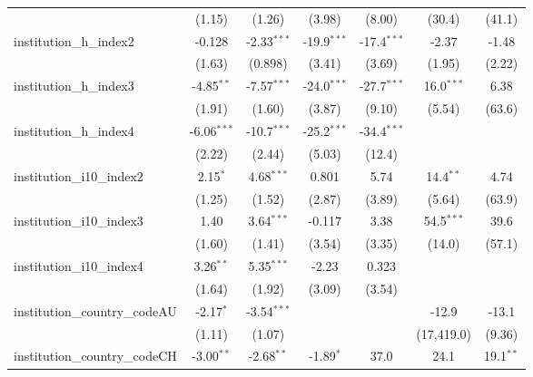 \begin{tabular}{lcccccc}
                                         & (1.15)        & (1.26)        & (3.98)        & (8.00)        & (30.4)       & (41.1)\\   
   institution\_h\_index2                & -0.128        & -2.33$^{***}$ & -19.9$^{***}$ & -17.4$^{***}$ & -2.37        & -1.48\\   
                                         & (1.63)        & (0.898)       & (3.41)        & (3.69)        & (1.95)       & (2.22)\\   
   institution\_h\_index3                & -4.85$^{**}$  & -7.57$^{***}$ & -24.0$^{***}$ & -27.7$^{***}$ & 16.0$^{***}$ & 6.38\\   
                                         & (1.91)        & (1.60)        & (3.87)        & (9.10)        & (5.54)       & (63.6)\\   
   institution\_h\_index4                & -6.06$^{***}$ & -10.7$^{***}$ & -25.2$^{***}$ & -34.4$^{***}$ &              &   \\   
                                         & (2.22)        & (2.44)        & (5.03)        & (12.4)        &              &   \\   
   institution\_i10\_index2              & 2.15$^{*}$    & 4.68$^{***}$  & 0.801         & 5.74          & 14.4$^{**}$  & 4.74\\   
                                         & (1.25)        & (1.52)        & (2.87)        & (3.89)        & (5.64)       & (63.9)\\   
   institution\_i10\_index3              & 1.40          & 3.64$^{***}$  & -0.117        & 3.38          & 54.5$^{***}$ & 39.6\\   
                                         & (1.60)        & (1.41)        & (3.54)        & (3.35)        & (14.0)       & (57.1)\\   
   institution\_i10\_index4              & 3.26$^{**}$   & 5.35$^{***}$  & -2.23         & 0.323         &              &   \\   
                                         & (1.64)        & (1.92)        & (3.09)        & (3.54)        &              &   \\   
   institution\_country\_codeAU          & -2.17$^{*}$   & -3.54$^{***}$ &               &               & -12.9        & -13.1\\   
                                         & (1.11)        & (1.07)        &               &               & (17,419.0)   & (9.36)\\   
   institution\_country\_codeCH          & -3.00$^{**}$  & -2.68$^{**}$  & -1.89$^{*}$   & 37.0          & 24.1         & 19.1$^{**}$\\   

\end{tabular}
